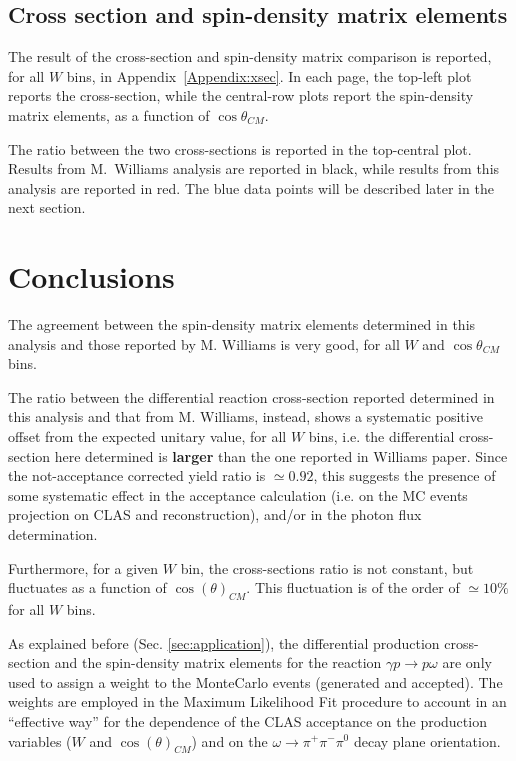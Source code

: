 \documentclass[a4paper,10pt]{report}
\newcommand{\decay}{$\omega \rightarrow \pi^+ \pi^- \pi^0$ }
\newcommand{\production}{$\gamma p \rightarrow p \omega$ }
\begin{document}
\subsection{Cross section and spin-density matrix elements}
The result of the cross-section and spin-density matrix comparison is reported, for all $W$ bins, in Appendix~\ref{Appendix:xsec}. In each page, the top-left plot reports the cross-section, while the central-row plots report the spin-density matrix elements, as a function of $\cos{\theta}_{CM}$.

The ratio between the two cross-sections is reported in the top-central plot. Results from M.~Williams analysis are reported in black, while results from this analysis are reported in red. The blue data points will be described later in the next section.




\section{Conclusions}

The agreement between the spin-density matrix elements determined in this analysis and those reported by M. Williams is very good, for all $W$ and $\cos{\theta}_{CM}$ bins.  

The ratio between the differential reaction cross-section reported determined in this analysis and that from M. Williams, instead, shows a systematic positive offset from the expected unitary value, for all $W$ bins, i.e. the differential cross-section here determined is \textbf{larger} than the one reported in Williams paper.
Since the not-acceptance corrected yield ratio is $\simeq 0.92$, this suggests the presence of some systematic effect in the acceptance calculation (i.e. on the MC events projection on CLAS and reconstruction), and/or in the photon flux determination. 

Furthermore, for a given $W$ bin, the cross-sections ratio is not constant, but fluctuates as a function of $\cos(\theta)_{CM}$. This fluctuation is of the order of $\simeq 10\%$ for all $W$ bins.

As explained before (Sec. \ref{sec:application}), the differential production cross-section and the spin-density matrix elements for the reaction \production are only used to assign a weight to the MonteCarlo events (generated and accepted).
The weights are employed in the Maximum Likelihood Fit procedure to account in an ``effective way'' for the dependence of the CLAS acceptance on the production variables ($W$ and $\cos(\theta)_{CM}$) and on the \decay decay plane orientation. 
\end{document}
